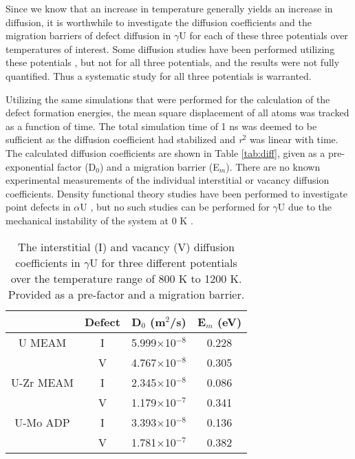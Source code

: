 \documentclass[review]{elsarticle}
\begin{document}
\FloatBarrier

Since we know that an increase in temperature generally yields an increase in diffusion, it is worthwhile to investigate the diffusion coefficients and the migration barriers of defect diffusion in $\gamma$U for each of these three potentials over temperatures of interest. Some diffusion studies have been performed utilizing these potentials \cite{smirnovaADP, smirnova2015}, but not for all three potentials, and the results were not fully quantified. Thus a systematic study for all three potentials is warranted.

Utilizing the same simulations that were performed for the calculation of the defect formation energies, the mean square displacement of all atoms was tracked as a function of time. The total simulation time of 1 ns was deemed to be sufficient as the diffusion coefficient had stabilized and \textit{r}$^{2}$ was linear with time. The calculated diffusion coefficients are shown in Table \ref{tab:diff}, given as a pre-exponential factor (D$_{0}$) and a migration barrier (E$_{m}$). There are no known experimental measurements of the individual interstitial or vacancy diffusion coefficients. Density functional theory studies have been performed to investigate point defects in $\alpha$U \cite{wirth2011}, but no such studies can be performed for $\gamma$U due to the mechanical instability of the system at 0 K \cite{beeler2010}.

\begin{table}[h]
\caption{The interstitial (I) and vacancy (V) diffusion coefficients in $\gamma$U for three different potentials over the temperature range of 800 K to 1200 K. Provided as a pre-factor and a migration barrier.} \label{tab:diff}
\begin{center}
\begin{tabular}{|c|c|c|c|}
	\hline
	& Defect & D$_{0}$ (m$^{2}$/s) & E$_{m}$ (eV)\\
	 \hline
	U MEAM & I & 5.999$\times$10$^{-8}$ & 0.228 \\
			& V & 4.767$\times$10$^{-8}$ & 0.305 \\
			\hline
	U-Zr MEAM & I & 2.345$\times$10$^{-8}$ & 0.086 \\
			& V & 1.179$\times$10$^{-7}$ & 0.341 \\
			\hline
	U-Mo ADP & I & 3.393$\times$10$^{-8}$ & 0.136 \\
			& V & 1.781$\times$10$^{-7}$ & 0.382 \\
	\hline
\end{tabular}
\end{center}
\label{default}
\end{table}
\end{document}
